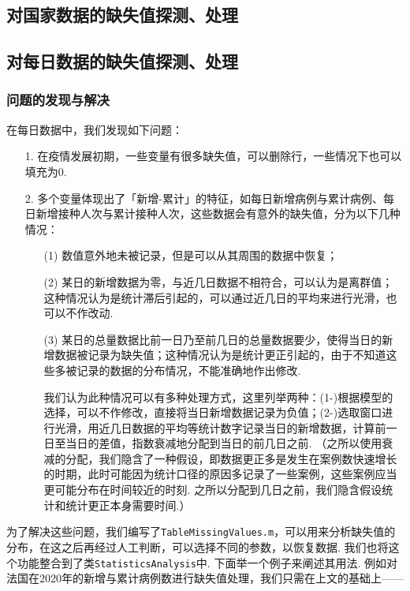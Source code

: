 \documentclass[a4paper, titlepage]{article}
\begin{document}
        \subsection{对国家数据的缺失值探测、处理}
        \subsection{对每日数据的缺失值探测、处理}
        \subsubsection{问题的发现与解决}
        在每日数据中，我们发现如下问题：
        \begin{enumerate}
            \item [1.] 在疫情发展初期，一些变量有很多缺失值，可以删除行，一些情况下也可以填充为$0$.
            \item [2.] 多个变量体现出了「新增-累计」的特征，如每日新增病例与累计病例、每日新增接种人次与累计接种人次，这些数据会有意外的缺失值，分为以下几种情况：
                \begin{enumerate}
                    \item [(1)] 数值意外地未被记录，但是可以从其周围的数据中恢复；
                    \item [(2)] 某日的新增数据为零，与近几日数据不相符合，可以认为是离群值；这种情况认为是统计滞后引起的，可以通过近几日的平均来进行光滑，也可以不作改动.
                    \item [(3)] 某日的总量数据比前一日乃至前几日的总量数据要少，使得当日的新增数据被记录为缺失值；这种情况认为是统计更正引起的，由于不知道这些多被记录的数据的分布情况，不能准确地作出修改.
                    
                    {\kaishu 我们认为此种情况可以有多种处理方式，这里列举两种：(1-)根据模型的选择，可以不作修改，直接将当日新增数据记录为负值；(2-)选取窗口进行光滑，用近几日数据的平均等统计数字记录当日的新增数据，计算前一日至当日的差值，指数衰减地分配到当日的前几日之前. （之所以使用衰减的分配，我们隐含了一种假设，即数据更正多是发生在案例数快速增长的时期，此时可能因为统计口径的原因多记录了一些案例，这些案例应当更可能分布在时间较近的时刻. 之所以分配到几日之前，我们隐含假设统计和统计更正本身需要时间.）}
                \end{enumerate}
        \end{enumerate}
        为了解决这些问题，我们编写了\texttt{TableMissingValues.m}，可以用来分析缺失值的分布，在这之后再经过人工判断，可以选择不同的参数，以恢复数据. 我们也将这个功能整合到了类\texttt{StatisticsAnalysis}中. 下面举一个例子来阐述其用法. 例如对法国在2020年的新增与累计病例数进行缺失值处理，我们只需在上文的基础上——
\end{document}

